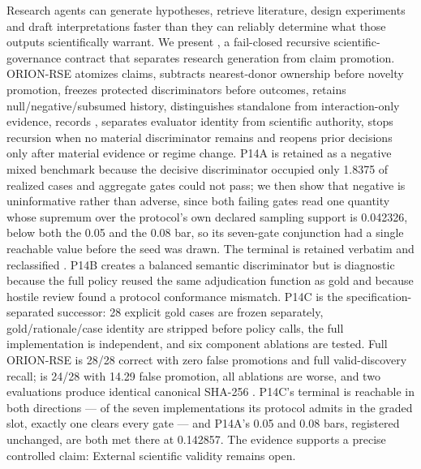 \markdownRendererDocumentBegin
Research agents can generate hypotheses, retrieve literature, design experiments and draft interpretations faster than they can reliably determine what those outputs scientifically warrant. We present , a fail-closed recursive scientific-governance contract that separates research generation from claim promotion. ORION-RSE atomizes claims, subtracts nearest-donor ownership before novelty promotion, freezes protected discriminators before outcomes, retains null/negative/subsumed history, distinguishes standalone from interaction-only evidence, records , separates evaluator identity from scientific authority, stops recursion when no material discriminator remains and reopens prior decisions only after material evidence or regime change. P14A is retained as a negative mixed benchmark because the decisive discriminator occupied only 1.8375\markdownRendererPercentSign{} of realized cases and aggregate gates could not pass; we then show that negative is uninformative rather than adverse, since both failing gates read one quantity whose supremum over the protocol's own declared sampling support is 0.042326, below both the 0.05 and the 0.08 bar, so its seven-gate conjunction had a single reachable value before the seed was drawn. The terminal is retained verbatim and reclassified . P14B creates a balanced semantic discriminator but is diagnostic because the full policy reused the same adjudication function as gold and because hostile review found a protocol conformance mismatch. P14C is the specification-separated successor: 28 explicit gold cases are frozen separately, gold/rationale/case identity are stripped before policy calls, the full implementation is independent, and six component ablations are tested. Full ORION-RSE is 28/28 correct with zero false promotions and full valid-discovery recall;  is 24/28 with 14.29\markdownRendererPercentSign{} false promotion, all ablations are worse, and two evaluations produce identical canonical SHA-256 . P14C's terminal is reachable in both directions — of the seven implementations its protocol admits in the graded slot, exactly one clears every gate — and P14A's 0.05 and 0.08 bars, registered unchanged, are both met there at 0.142857. The evidence supports a precise controlled claim:  External scientific validity remains open.\markdownRendererDocumentEnd